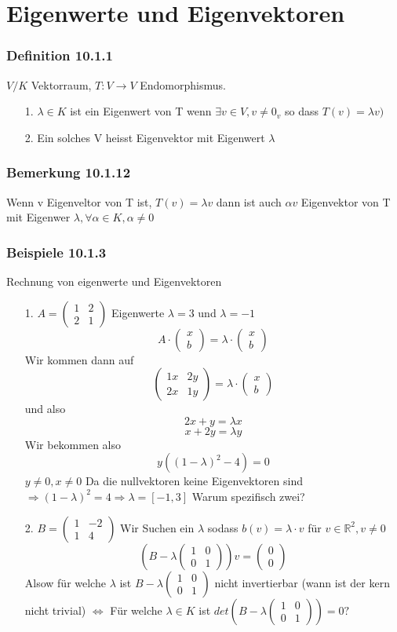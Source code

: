 \documentclass{article}
\newcommand{\beispiel}[1]{\subsubsection*{Beispiele {#1}}}
\newcommand{\bemerkung}[1]{\subsubsection*{Bemerkung {#1}}}
\newcommand{\definition}[1]{\subsubsection*{Definition {#1}}}
\begin{document}
\section*{Eigenwerte und Eigenvektoren}
\definition{10.1.1} $V/K$ Vektorraum, $T:V\rightarrow V$ Endomorphismus.
\begin{itemize}
\item[1.]$\lambda\in K$ ist ein Eigenwert von T wenn $\exists v\in V, v\neq 0_v$ so dass $T(v)=\lambda v)$
\item[2.]Ein solches V heisst Eigenvektor  mit Eigenwert $\lambda$
\end{itemize}
\bemerkung{10.1.12} Wenn v Eigenveltor von T ist, $T(v)=\lambda v$ dann ist auch $\alpha v$ Eigenvektor von T mit Eigenwer $\lambda, \forall \alpha\in K, \alpha \neq0$
\beispiel{10.1.3} Rechnung von eigenwerte und Eigenvektoren
\begin{itemize}
\item[1.]{$A= \begin{pmatrix}1&2\\2&1\end{pmatrix}$ Eigenwerte $\lambda = 3$ und $\lambda=-1$
\[A\cdot\begin{pmatrix}x\\b\end{pmatrix} = \lambda\cdot\begin{pmatrix}x\\b\end{pmatrix}\]
Wir kommen dann auf
\[\begin{pmatrix}1x&2y\\2x&1y\end{pmatrix}=\lambda\cdot\begin{pmatrix}x\\b\end{pmatrix}\]
und also
\[2x+y=\lambda x\]
\[x+2y=\lambda y\]
Wir bekommen also
\[y((1-\lambda)^2-4)=0\]
$y\neq0, x\neq0$ Da die nullvektoren keine Eigenvektoren sind $\Rightarrow (1-\lambda)^2=4\Rightarrow \lambda=[-1,3]$ Warum spezifisch zwei?}
\item[2.]{$B=\begin{pmatrix}1&-2\\1&4\end{pmatrix}$
 Wir Suchen ein $\lambda$ sodass $b(v)=\lambda\cdot v$ für $v\in \mathbb{R} ^2, v\neq0$
 \[ \left(B-\lambda\begin{pmatrix}1&0\\0&1\end{pmatrix}\right)v=\begin{pmatrix}0\\0\end{pmatrix}\] Alsow für welche $\lambda$ ist $B-\lambda\begin{pmatrix}1&0\\0&1\end{pmatrix}$ nicht invertierbar (wann ist der kern nicht trivial) $\Leftrightarrow$ Für welche $\lambda \in K$ ist $det\left(B-\lambda\begin{pmatrix}1&0\\0&1\end{pmatrix}\right)=0?$
}
\end{itemize}
\end{document}
